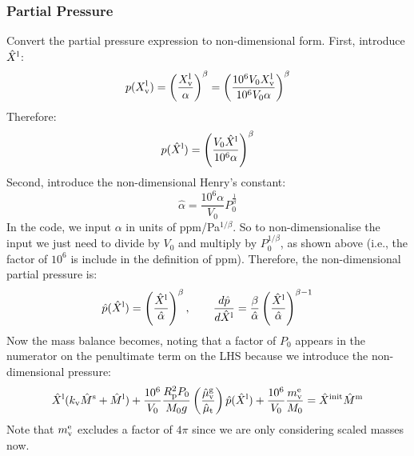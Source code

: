 \subsubsection{Partial Pressure}
Convert the partial pressure expression to non-dimensional form.  First, introduce $\hat{X}^{\rm l}$:
\begin{equation}
p( X_{\rm v}^{\rm l} ) = \left( \frac{X_{\rm v}^{\rm l}}{\alpha} \right)^\beta
 = \left( \frac{10^6 V_0 X_{\rm v}^{\rm l}}{10^6 V_0 \alpha} \right)^\beta
 \end{equation}
 Therefore:
 \begin{equation}
p( \hat{X}^{\rm l} ) = \left( \frac{V_0 \hat{X}^{\rm l}}{10^6 \alpha} \right)^\beta
\end{equation}
Second, introduce the non-dimensional Henry's constant:
\begin{equation}
\hat{\alpha} = \frac{10^6 \alpha}{V_0} P_0^\frac{1}{\beta}
\end{equation}
In the code, we input $\alpha$ in units of ppm/Pa$^{1/\beta}$.  So to non-dimensionalise the input we just need to divide by $V_0$ and multiply by $P_0^{1/\beta}$, as shown above (i.e., the factor of $10^6$ is include in the definition of ppm).  Therefore, the non-dimensional partial pressure is:
\begin{equation}
\hat{p} ( \hat{X}^{\rm l} ) = \left( \frac{\hat{X}^{\rm l}}{\hat{\alpha}} \right) ^ {\beta}, \qquad \frac{d \hat{p}}{d \hat{X}^{\rm l}} = \frac{\beta}{\hat{\alpha}} \left( \frac{\hat{X}^{\rm l}}{\hat{\alpha}} \right)^{\beta-1}
\end{equation}
Now the mass balance becomes, noting that a factor of $P_0$ appears in the numerator on the penultimate term on the LHS because we introduce the non-dimensional pressure:
\begin{equation}
\hat{X}^{\rm l} (k_{\rm v} \hat{M}^{\rm s} + \hat{M}^{\rm l}) + \frac{10^6}{V_0} \frac{R_{\rm p}^2 P_0}{M_0 g} \left( \frac{\hat{\mu}_{\rm v}^{\rm g}}{\hat{\mu}_{\rm t}} \right) \hat{p} (\hat{X}^{\rm l}) + \frac{10^6}{V_0} \frac{m_{\rm v}^{\rm e}}{M_0} = \hat{X}^{\rm init} \hat{M}^{\rm m}
\end{equation}
Note that $m_{\rm v}^{\rm e}$ excludes a factor of $4\pi$ since we are only considering scaled masses now.
